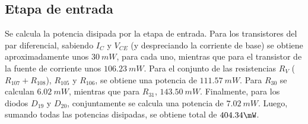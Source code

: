 \subsection{Etapa de entrada}
Se calcula la potencia disipada por la etapa de entrada. Para los transistores del par diferencial, sabiendo $I_C$ y $V_{CE}$ (y despreciando la corriente de base) se obtiene aproximadamente unos $30 \ mW$, para cada uno, mientras que para el transistor de la fuente de corriente unos $106.23 \ mW$. Para el conjunto de las resistencias $R_V$ ($R_{107} + R_108$), $R_{105}$ y $R_{106}$, se obtiene una potencia de $111.57 \ mW$. Para $R_{30}$ se calculan $6.02 \ mW$, mientras que para $R_{31}$, $143.50 \ mW$. Finalmente, para los diodos $D_{19}$ y $D_{20}$, conjuntamente se calcula una potencia de $7.02 \ mW$. Luego, sumando todas las potencias disipadas, se obtiene total de $404.34 \mW$. %



